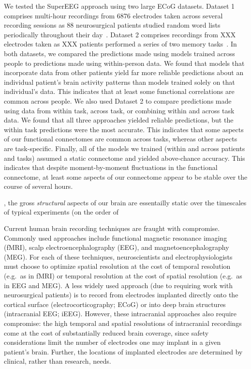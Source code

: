 We tested the SuperEEG approach using two large ECoG datasets. Dataset 1 comprises multi-hour recordings from 6876 electrodes taken across several recording sessions as 88 neurosurgical patients studied random word lists periodically throughout their day~\cite{SedeEtal03, SedeEtal07a,
  SedeEtal07b, MannEtal11, MannEtal12}.  Dataset 2 comprises recordings from XXX electrodes taken as XXX patients performed a series of two memory tasks~\citep{EzzyEtal17, HoraEtal17, KragEtal17, KuceEtal17, LinEtal17, SoloEtal18, WeidEtal18, EzzyEtal18, KuceEtal18}.  In both datasets,
  we compared the predictions made using models trained across people to predictions made using within-person data.  We found that models that incorporate data from other patients yield far more reliable predictions about an individual patient's brain activity patterns than models trained solely on that individual's data.  This indicates that at least some functional correlations are common across people.  We also used Dataset 2 to compare predictions made using data from within task, across task, or combining within and across task data.  We found that all three approaches yielded reliable predictions, but the within task predictions were the most accurate.  This indicates that some aspects of our functional connectomes are common across tasks, whereas other aspects are task-specific.  Finally, all of the models we trained (within and across patients and tasks) assumed a static connectome and yielded above-chance accuracy.  This indicates that despite moment-by-moment fluctuations in the functional connectome, at least some aspects of our connectome appear to be stable over the course of several hours.






, the gross \textit{structural} aspects of our brain are essentailly static over the timescales of typical experiments (on the order of

Current human brain recording techniques are fraught with compromise.
Commonly used approaches include functional magnetic resonance imaging
(fMRI), scalp electroencephalography (EEG), and magnetoencephalography
(MEG).  For each of these techniques, neuroscientists
and electrophysiologists must choose to optimize spatial resolution
at the cost of temporal resolution (e.g.\ as in fMRI) or temporal
resolution at the cost of spatial resolution (e.g.\ as in EEG
and MEG).  A less widely used approach (due to requiring work with
neurosurgical patients) is to record from electrodes implanted
directly onto the cortical surface (electrocorticography; ECoG) or
into deep brain structures (intracranial EEG; iEEG).  However, these
intracranial approaches also require compromise: the high temporal and
spatial resolutions of intracranial recordings come at the cost of
substantially reduced brain coverage, since safety considerations
limit the number of electrodes one may implant in a given patient's
brain.  Further, the locations of implanted electrodes are determined by clinical,
rather than research, needs.

